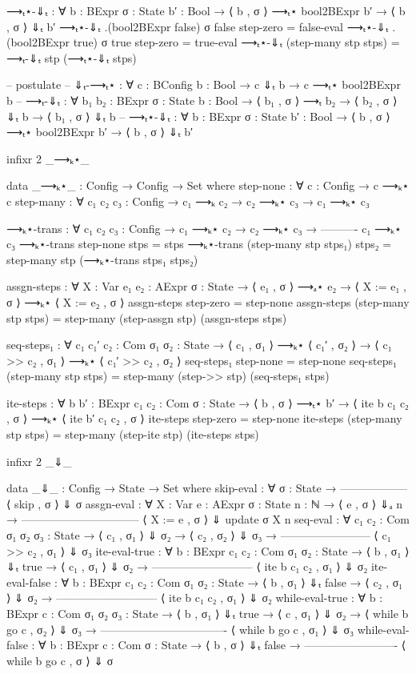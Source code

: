 \documentclass{lecturenotes}
\begin{document}
\begin{code}[hide]
⟶ₜ⋆-⇓ₜ : ∀ {b : BExpr} {σ : State} {b′ : Bool} → ⟨ b , σ ⟩ ⟶ₜ⋆ bool2BExpr b′ → ⟨ b , σ ⟩ ⇓ₜ b′
⟶ₜ⋆-⇓ₜ {.(bool2BExpr false)} {σ} {false} step-zero = false-eval
⟶ₜ⋆-⇓ₜ {.(bool2BExpr true)} {σ} {true} step-zero = true-eval
⟶ₜ⋆-⇓ₜ (step-many stp stps) = ⟶ₜ-⇓ₜ stp (⟶ₜ⋆-⇓ₜ stps)

-- postulate
  -- ⇓ₜ-⟶ₜ⋆ : ∀ {c : BConfig} {b : Bool} → c ⇓ₜ b → c ⟶ₜ⋆ bool2BExpr b
  -- ⟶ₜ-⇓ₜ : ∀ {b₁ b₂ : BExpr} {σ : State} {b : Bool} → ⟨ b₁ , σ ⟩ ⟶ₜ b₂ → ⟨ b₂ , σ ⟩ ⇓ₜ b → ⟨ b₁ , σ ⟩ ⇓ₜ b
  -- ⟶ₜ⋆-⇓ₜ : ∀ {b : BExpr} {σ : State} {b′ : Bool} → ⟨ b , σ ⟩ ⟶ₜ⋆ bool2BExpr b′ → ⟨ b , σ ⟩ ⇓ₜ b′


infixr 2 _⟶ₖ⋆_

data _⟶ₖ⋆_ : Config → Config → Set where
  step-none : ∀ {c : Config} → c ⟶ₖ⋆ c
  step-many : ∀ {c₁ c₂ c₃ : Config} → c₁ ⟶ₖ c₂ → c₂ ⟶ₖ⋆ c₃ → c₁ ⟶ₖ⋆ c₃

⟶ₖ⋆-trans : ∀ {c₁ c₂ c₃ : Config} →
  c₁ ⟶ₖ⋆ c₂ →
  c₂ ⟶ₖ⋆ c₃ →
  ----------
  c₁ ⟶ₖ⋆ c₃
⟶ₖ⋆-trans step-none stps = stps
⟶ₖ⋆-trans (step-many stp stps₁) stps₂ = step-many stp (⟶ₖ⋆-trans stps₁ stps₂)

assgn-steps : ∀ {X : Var} {e₁ e₂ : AExpr} {σ : State} →
  ⟨ e₁ , σ ⟩ ⟶ₐ⋆ e₂ →
  ⟨ X := e₁ , σ ⟩ ⟶ₖ⋆ ⟨ X := e₂ , σ ⟩
assgn-steps step-zero = step-none
assgn-steps (step-many stp stps) = step-many (step-assgn stp) (assgn-steps stps)

seq-steps₁ : ∀ {c₁ c₁′ c₂ : Com} {σ₁ σ₂ : State} →
  ⟨ c₁ , σ₁ ⟩ ⟶ₖ⋆ ⟨ c₁′ , σ₂ ⟩ →
  ⟨ c₁ >> c₂ , σ₁ ⟩ ⟶ₖ⋆ ⟨ c₁′ >> c₂ , σ₂ ⟩
seq-steps₁ step-none = step-none
seq-steps₁ (step-many stp stps) = step-many (step->> stp) (seq-steps₁ stps)

ite-steps : ∀ {b b′ : BExpr} {c₁ c₂ : Com} {σ : State} →
  ⟨ b , σ ⟩ ⟶ₜ⋆ b′ →
  ⟨ ite b c₁ c₂ , σ ⟩ ⟶ₖ⋆ ⟨ ite b′ c₁ c₂ , σ ⟩
ite-steps step-zero = step-none
ite-steps (step-many stp stps) = step-many (step-ite stp) (ite-steps stps) 

infixr 2 _⇓_
  
data _⇓_ : Config → State → Set where
  skip-eval : ∀ {σ : State} →
    ------------------
     ⟨ skip , σ ⟩ ⇓ σ
  assgn-eval : ∀ {X : Var} {e : AExpr} {σ : State} {n : ℕ} →
          ⟨ e , σ ⟩ ⇓ₐ n →
    --------------------------------
     ⟨ X := e , σ ⟩ ⇓ update σ X n 
  seq-eval : ∀ {c₁ c₂ : Com} {σ₁ σ₂ σ₃ : State} →
           ⟨ c₁ , σ₁ ⟩ ⇓ σ₂ →
           ⟨ c₂ , σ₂ ⟩ ⇓ σ₃ →
    ------------------------
     ⟨ c₁ >> c₂ , σ₁ ⟩ ⇓ σ₃
  ite-eval-true : ∀ {b : BExpr} {c₁ c₂ : Com} {σ₁ σ₂ : State} →
        ⟨ b  , σ₁ ⟩ ⇓ₜ true →
        ⟨ c₁ , σ₁ ⟩ ⇓  σ₂ →
    ---------------------------
     ⟨ ite b c₁ c₂ , σ₁ ⟩ ⇓ σ₂
  ite-eval-false : ∀ {b : BExpr} {c₁ c₂ : Com} {σ₁ σ₂ : State} →
        ⟨ b  , σ₁ ⟩ ⇓ₜ false →
        ⟨ c₂ , σ₁ ⟩ ⇓  σ₂ →
    ---------------------------
     ⟨ ite b c₁ c₂ , σ₁ ⟩ ⇓ σ₂
  while-eval-true : ∀ {b : BExpr} {c : Com} {σ₁ σ₂ σ₃ : State} →
    ⟨ b , σ₁ ⟩ ⇓ₜ true →
    ⟨ c , σ₁ ⟩ ⇓ σ₂ →
    ⟨ while b go c , σ₂ ⟩ ⇓ σ₃ →
    ----------------------------------
    ⟨ while b go c , σ₁ ⟩ ⇓ σ₃
  while-eval-false : ∀ {b : BExpr} {c : Com} {σ : State} →
    ⟨ b , σ ⟩ ⇓ₜ false →
    -------------------------
    ⟨ while b go c , σ ⟩ ⇓ σ


\end{code}
\end{document}
